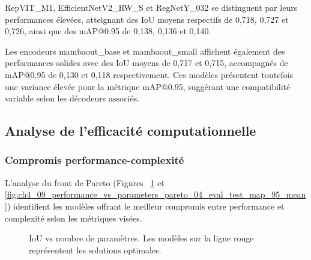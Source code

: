 RepVIT\_M1, EfficientNetV2\_RW\_S et RegNetY\_032 se distinguent par leurs performances élevées, atteignant des IoU moyens respectifs de 0,718, 0,727 et 0,726, ainsi que des mAP@0.95 de 0,138, 0,136 et 0,140.

Les encodeurs mambaout\_base et mambaout\_small affichent également des performances solides avec des IoU moyens de 0,717 et 0,715, accompagnés de mAP@0.95 de 0,130 et 0,118 respectivement. Ces modèles présentent toutefois une variance élevée pour la métrique mAP@0.95, suggérant une compatibilité variable selon les décodeurs associés.


\subsection{Analyse de l'efficacité computationnelle}

\subsubsection{Compromis performance-complexité}

L'analyse du front de Pareto (Figures ~\ref{fig:ch4_09_performance_vs_parameters_pareto_01_eval_test_iou_mean} et \ref{fig:ch4_09_performance_vs_parameters_pareto_04_eval_test_map_95_mean}) identifient les modèles offrant le meilleur compromis entre performance et complexité selon les métriques visées.

\begin{figure}[H]
    \centering
    \caption{IoU vs nombre de paramètres. Les modèles sur la ligne rouge représentent les solutions optimales.}
    \label{fig:ch4_09_performance_vs_parameters_pareto_01_eval_test_iou_mean}
\end{figure}

